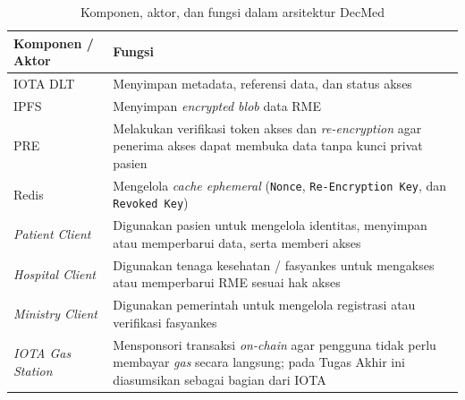 \begin{table}[H]
	\centering
	\caption{Komponen, aktor, dan fungsi dalam arsitektur DecMed}
	\label{tab:decmed-komponen}
	\begin{tabularx}{\textwidth}{|>{\raggedright\arraybackslash}p{}|>{\raggedright\arraybackslash}X|}
		\hline
		\textbf{Komponen / Aktor} & \textbf{Fungsi}                                                                                                                                                    \\
		\hline
		IOTA DLT                  & Menyimpan metadata, referensi data, dan status akses                                                                                                               \\
		\hline
		IPFS                      & Menyimpan \textit{encrypted blob} data RME                                                                                                                         \\
		\hline
		PRE                       & Melakukan verifikasi token akses dan \textit{re-encryption} agar penerima akses dapat membuka data tanpa kunci privat pasien                                       \\
		\hline
		Redis                     & Mengelola \textit{cache ephemeral} (\texttt{Nonce}, \texttt{Re-Encryption Key}, dan \texttt{Revoked Key})
		\\
		\hline
		\textit{Patient Client}   & Digunakan pasien untuk mengelola identitas, menyimpan atau memperbarui data, serta memberi akses                                                                   \\
		\hline
		\textit{Hospital Client}  & Digunakan tenaga kesehatan / fasyankes untuk mengakses atau memperbarui RME sesuai hak akses                                                                       \\
		\hline
		\textit{Ministry Client}  & Digunakan pemerintah untuk mengelola registrasi atau verifikasi fasyankes                                                                                          \\
		\hline
		\textit{IOTA Gas Station} & Mensponsori transaksi \textit{on-chain} agar pengguna tidak perlu membayar \textit{gas} secara langsung; pada Tugas Akhir ini diasumsikan sebagai bagian dari IOTA \\
		\hline
	\end{tabularx}
\end{table}

